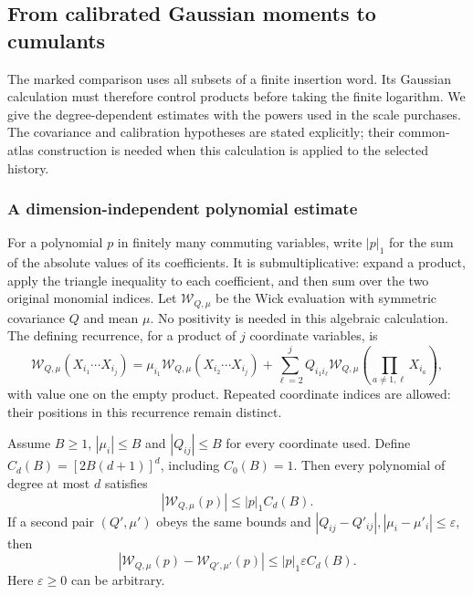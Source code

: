 \subsection{From calibrated Gaussian moments to cumulants}
\label{sec:allarity-cumulant-comparison}

The marked comparison uses all subsets of a finite insertion word. Its
Gaussian calculation must therefore control products before taking the
finite logarithm. We give the degree-dependent estimates with the powers
used in the scale purchases. The covariance and calibration hypotheses
are stated explicitly; their common-atlas construction is needed when
this calculation is applied to the selected history.

\subsubsection{A dimension-independent polynomial estimate}

For a polynomial $p$ in finitely many commuting variables, write
$|p|_1$ for the sum of the absolute values of its coefficients. It is
submultiplicative: expand a product, apply the triangle inequality to
each coefficient, and then sum over the two original monomial indices.
Let $\mathcal W_{Q,\mu}$ be the Wick evaluation with symmetric
covariance $Q$ and mean $\mu$. No positivity is needed in this algebraic
calculation. The defining recurrence, for a product of $j$ coordinate
variables, is
\begin{equation}\label{eq:allarity-wick-recursion}
 \mathcal W_{Q,\mu}(X_{i_1}\cdots X_{i_j})
 =\mu_{i_1}\mathcal W_{Q,\mu}(X_{i_2}\cdots X_{i_j})
  +\sum_{\ell=2}^j Q_{i_1i_\ell}
       \mathcal W_{Q,\mu}\left(\prod_{a\ne1,\ell}X_{i_a}\right),
\end{equation}
with value one on the empty product. Repeated coordinate indices are
allowed: their positions in this recurrence remain distinct.

Assume $B\ge1$, $|\mu_i|\le B$ and $|Q_{ij}|\le B$ for every
coordinate used. Define $C_d(B)=[2B(d+1)]^d$, including $C_0(B)=1$.
Then every polynomial of degree at most $d$ satisfies
\begin{equation}\label{eq:allarity-wick-bound}
           |\mathcal W_{Q,\mu}(p)|\le |p|_1 C_d(B).
\end{equation}
If a second pair $(Q',\mu')$ obeys the same bounds and
$|Q_{ij}-Q'_{ij}|,|\mu_i-\mu'_i|\le\varepsilon$, then
\begin{equation}\label{eq:allarity-wick-difference}
 |\mathcal W_{Q,\mu}(p)-\mathcal W_{Q',\mu'}(p)|
                   \le |p|_1\varepsilon C_d(B).
\end{equation}
Here $\varepsilon\ge0$ can be arbitrary.

